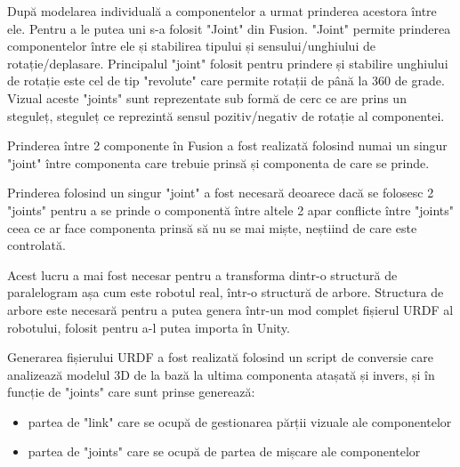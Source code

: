 După modelarea individuală a componentelor a urmat prinderea acestora între ele. Pentru a le putea uni s-a folosit "Joint" din Fusion. "Joint" permite prinderea componentelor între ele și stabilirea tipului și sensului/unghiului de rotație/deplasare. Principalul "joint" folosit pentru prindere și stabilire unghiului de rotație este cel de tip "revolute" care permite rotații de  până la 360 de grade. Vizual aceste "joints" sunt reprezentate sub formă de cerc ce are prins un steguleț, steguleț ce  reprezintă sensul pozitiv/negativ de rotație al componentei. 


Prinderea între 2 componente în Fusion a fost realizată folosind numai un singur "joint" între componenta care trebuie prinsă și componenta de care se prinde.

Prinderea folosind un singur "joint" a fost necesară deoarece dacă se folosesc 2 "joints" pentru a se prinde o componentă între altele 2 apar conflicte între "joints" ceea ce ar face componenta prinsă  să nu se mai miște, neștiind de care este controlată.


Acest lucru a mai fost necesar pentru a transforma  dintr-o structură de paralelogram așa cum este robotul real,  într-o structură de arbore.  Structura de arbore este necesară pentru a putea genera într-un mod complet fișierul URDF al robotului, folosit pentru a-l putea importa în Unity. 

Generarea fișierului URDF a fost realizată folosind un script de conversie care analizează modelul 3D de la bază la ultima componenta atașată și invers, și în funcție de "joints" care sunt prinse generează:
\begin{itemize}
	\item partea  de "link" care se ocupă de gestionarea părții vizuale ale componentelor
	\item partea  de "joints" care se ocupă de partea de mișcare ale componentelor
\end{itemize}


